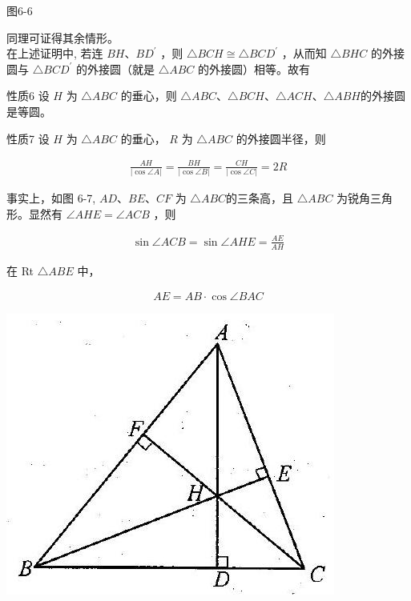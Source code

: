 \documentclass[10pt]{article}
\begin{document}
图6-6

同理可证得其余情形。\\
在上述证明中, 若连 $B H 、 B D^{\prime}$ ，则 $\triangle B C H \cong \triangle B C D^{\prime}$ ，从而知 $\triangle B H C$ 的外接圆与 $\triangle B C D^{\prime}$ 的外接圆（就是 $\triangle A B C$ 的外接圆）相等。故有

性质6 设 $H$ 为 $\triangle A B C$ 的垂心，则 $\triangle A B C 、 \triangle B C H 、 \triangle A C H 、 \triangle A B H$的外接圆是等圆。

性质7 设 $H$ 为 $\triangle A B C$ 的垂心， $R$ 为 $\triangle A B C$ 的外接圆半径，则

\begin{align*}
\frac{A H}{|\cos \angle A|}=\frac{B H}{|\cos \angle B|}=\frac{C H}{|\cos \angle C|}=2 R \tag{6-13}
\end{align*}

事实上，如图 6-7, $A D 、 B E 、 C F$ 为 $\triangle A B C$的三条高，且 $\triangle A B C$ 为锐角三角形。显然有 $\angle A H E=\angle A C B$ ，则

\begin{align*}
\sin \angle A C B=\sin \angle A H E=\frac{A E}{A H}
\end{align*}

在 Rt $\triangle A B E$ 中，

\begin{align*}
A E=A B \cdot \cos \angle B A C
\end{align*}

\begin{center}
\includegraphics[max width=\textwidth]{2024_10_30_2c8f45efd4a519b08e1ag-062}
\end{center}
\end{document}
